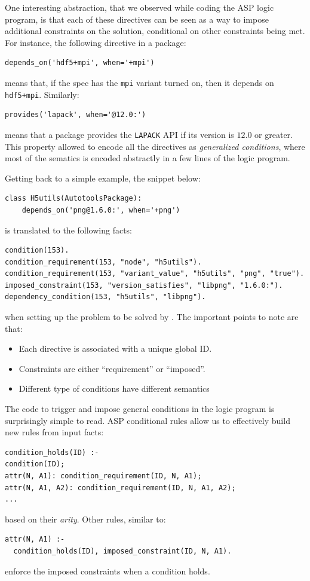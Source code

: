 One interesting abstraction, that we observed while coding the ASP logic program, is that each of these directives can be seen as a way to impose additional constraints on the solution, conditional on other constraints 
being met. For instance, the following directive in a package:
\begin{verbatim}
depends_on('hdf5+mpi', when='+mpi')
\end{verbatim}
means that, if the spec has the \texttt{mpi} variant turned on, then it depends on \texttt{hdf5+mpi}. Similarly:
\begin{verbatim}
provides('lapack', when='@12.0:')
\end{verbatim}
means that a package provides the \texttt{LAPACK} API if its version is $12.0$ or greater.
This property allowed to encode all the directives as \emph{generalized conditions}, where most of the sematics is encoded abstractly in a few lines of the logic program.

Getting back to a simple example, the snippet below:
\begin{verbatim}
class H5utils(AutotoolsPackage):
    depends_on('png@1.6.0:', when='+png')
\end{verbatim}
is translated to the following facts:
\begin{verbatim}
condition(153).
condition_requirement(153, "node", "h5utils").
condition_requirement(153, "variant_value", "h5utils", "png", "true").
imposed_constraint(153, "version_satisfies", "libpng", "1.6.0:").
dependency_condition(153, "h5utils", "libpng").
\end{verbatim}
when setting up the problem to be solved by \clingo. The important points to note are that:
\begin{itemize}
\item Each directive is associated with a unique global ID.
\item Constraints are either ``requirement'' or ``imposed''. 
\item Different type of conditions have different semantics\footnotemark
\end{itemize}
The code to trigger and impose general conditions in the logic program is surprisingly simple to read. ASP conditional rules allow us to effectively build new rules from input facts:
\begin{verbatim}
condition_holds(ID) :-
condition(ID);
attr(N, A1): condition_requirement(ID, N, A1);
attr(N, A1, A2): condition_requirement(ID, N, A1, A2);
...
\end{verbatim}
based on their \emph{arity}. Other rules, similar to:
\begin{verbatim}
attr(N, A1) :- 
  condition_holds(ID), imposed_constraint(ID, N, A1).
\end{verbatim}
enforce the imposed constraints when a condition holds.

